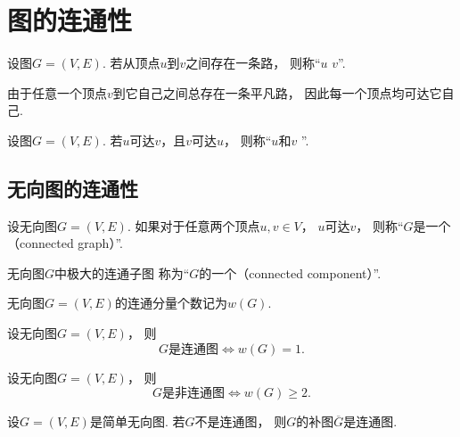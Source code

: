 \section{图的连通性}
\begin{definition}
设图\(G = (V,E)\).
若从顶点\(u\)到\(v\)之间存在一条路，
则称“\(u\)  \(v\)”.
\end{definition}

由于任意一个顶点\(v\)到它自己之间总存在一条平凡路，
因此每一个顶点均可达它自己.

\begin{definition}
设图\(G = (V,E)\).
若\(u\)可达\(v\)，且\(v\)可达\(u\)，
则称“\(u\)和\(v\) ”.
\end{definition}

\subsection{无向图的连通性}
\begin{definition}
设无向图\(G = (V,E)\).
如果对于任意两个顶点\(u,v \in V\)，
\(u\)可达\(v\)，
则称“\(G\)是一个（connected graph）”.
\end{definition}

\begin{definition}
无向图\(G\)中极大的连通子图
称为“\(G\)的一个（connected component）”.
\end{definition}

\begin{definition}
无向图\(G = (V,E)\)的连通分量个数记为\(w(G)\).
\end{definition}

\begin{theorem}
设无向图\(G = (V,E)\)，
则\[
	\text{$G$是连通图}
	\iff
	w(G) = 1.
\]
\end{theorem}

\begin{corollary}
设无向图\(G = (V,E)\)，
则\[
	\text{$G$是非连通图}
	\iff
	w(G) \geq 2.
\]
\end{corollary}

\begin{example}
设\(G = (V,E)\)是简单无向图.
若\(G\)不是连通图，
则\(G\)的补图\(\overline{G}\)是连通图.
\end{example}

